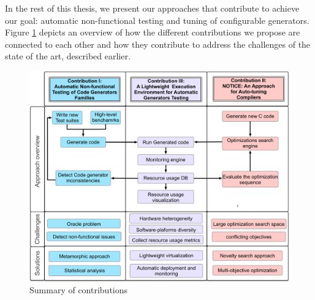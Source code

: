 
In the rest of this thesis, we present our approaches that contribute to achieve our goal: automatic non-functional testing and tuning of configurable generators. Figure \ref{fig:overview} depicts an overview of how the different contributions we propose are connected to each other and how they contribute to address the challenges of the state of the art, described earlier.

\begin{figure}[h]
	\center
	\includegraphics[scale=0.23]{Chapitre0/fig/overview}
	\caption{Summary of contributions}
	\label{fig:overview}
\end{figure}

